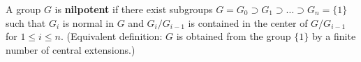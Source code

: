 A group $G$ is \textbf{nilpotent} if there exist subgroups $G = G_0 \supset G_1 \supset \dots \supset G_n = \{1\}$ such that $G_i$ is normal in $G$ and $G_i/G_{i-1}$ is contained in the center of $G/G_{i-1}$ for $1 \leq i \leq n$. (Equivalent definition: $G$ is obtained from the group $\{1\}$ by a finite number of central extensions.)
